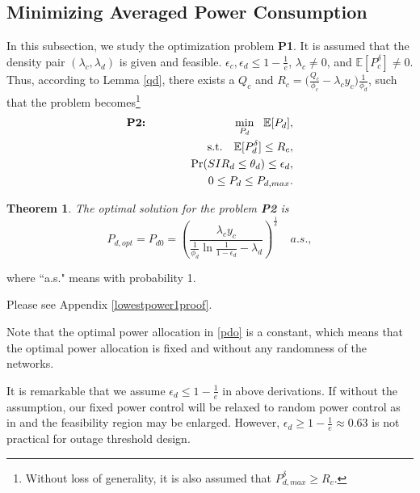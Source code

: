 \documentclass[12pt, draftclsnofoot, journal, letterpaper, onecolumn]{IEEEtran}
\newtheorem{theorem}{Theorem}[section]
\begin{document}
\subsection{Minimizing Averaged Power Consumption}

In this subsection, we study the optimization problem \textbf{P1}. It is assumed that the density pair $(\lambda_c,\lambda_d)$ is given and feasible. $\epsilon_c,\epsilon_d\leq 1-\frac{1}{e}$, $\lambda_c\not=0$, and $\mathbb{E}[P_c^\delta]\not=0$. Thus, according to Lemma \ref{qd}, there exists a $Q_c$ and $R_c=\big(\frac{Q_c}{\phi_c}-\lambda_cy_c\big)\frac{1}{\phi_d}$, such that the problem becomes\footnote{Without loss of generality, it is also assumed that $P_{d,max}^\delta\geq R_c$.}
\begin{eqnarray}
  \textbf{P2:}~&&\min_{P_d}~~\mathbb{E}[P_d],\label{max3} \\
  &&~ {\rm s.t.}~~~\mathbb{E}[P_d^\delta]\leq R_c,\label{constrainc2}\\
&&~~~~~~~~\Pr(SIR_d\leq\theta_d)  \leq\epsilon_d,\label{constraind2}\\
&&~~~~~~~~0\leq P_ d  \leq P_{d,max}.\label{constraine2}
\end{eqnarray}



\begin{theorem}\label{lowestpower1}
The optimal solution for the problem \textbf{P2} is
\begin{equation}\label{pdo}
P_{d,opt}=P_{d0}=\left(\frac{\lambda_cy_c}{\frac{1}{\phi_d}\ln\frac{1}{1-\epsilon_d}-\lambda_d}\right)^{\frac{1}{\delta}} \phantom{aa} a.s.,
\end{equation}
\end{theorem}
where ``a.s." means with probability 1.

\begin{IEEEproof}
  Please see Appendix \ref{lowestpower1proof}.
\end{IEEEproof}

Note that the optimal power allocation in \eqref{pdo} is a constant, which means that the optimal power allocation is fixed and without any randomness of the networks.

It is remarkable that we assume $\epsilon_d\leq 1-\frac{1}{e}$ in above derivations. If without the assumption, our fixed power control will be relaxed to random power control as in \cite{RPC} and the feasibility region may be enlarged. However, $\epsilon_d\geq 1-\frac{1}{e}\approx0.63$ is not practical for outage threshold design.
\end{document}
